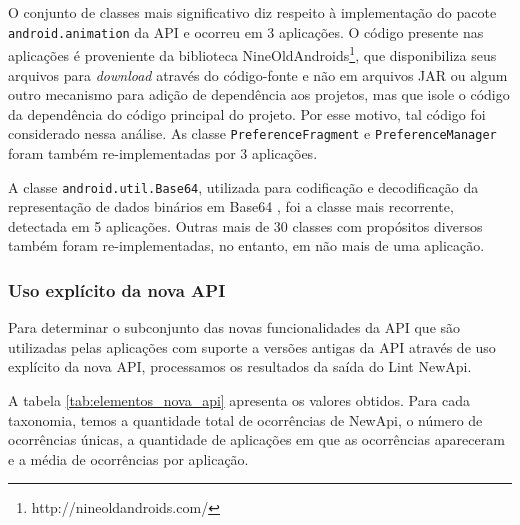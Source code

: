 O conjunto de classes mais significativo diz respeito à implementação do pacote 
\texttt{android.animation} da API e ocorreu em 3 aplicações. O código presente
nas aplicações é proveniente da biblioteca NineOldAndroids\footnote{http://nineoldandroids.com/},
que disponibiliza seus arquivos para
\textit{download} através do código-fonte e não em arquivos JAR ou algum outro mecanismo
para adição de dependência aos projetos, mas que isole o código da dependência
do código principal do projeto. Por esse motivo, tal código foi considerado
nessa análise. As classe \texttt{PreferenceFragment} e \texttt{PreferenceManager}
foram também re-implementadas por 3 aplicações.

A classe \texttt{android.util.Base64}, utilizada para codificação e decodificação
da representação de dados binários em Base64 \cite{RFC4648}, foi a classe mais
recorrente, detectada em 5 aplicações. Outras mais de 30 classes com propósitos 
diversos também foram re-implementadas, no entanto, em não mais de uma aplicação.

\subsubsection{Uso explícito da nova API}

Para determinar o subconjunto das novas funcionalidades da API que são utilizadas
pelas aplicações com suporte a versões antigas da API através de uso explícito da
nova API, processamos os resultados da saída do Lint NewApi.

A tabela \ref{tab:elementos_nova_api} apresenta os valores obtidos. Para cada
taxonomia, temos a quantidade total de ocorrências de NewApi, o número de
ocorrências únicas, a quantidade de aplicações em que as ocorrências apareceram
e a média de ocorrências por aplicação.

